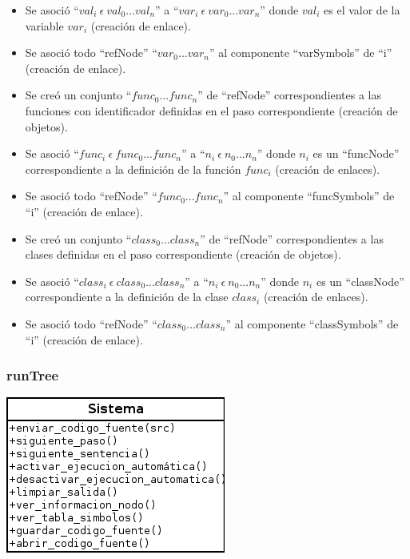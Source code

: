 \begin{framed}
\begin{description}
\begin {itemize}
         \item Se asoció ``$val_i\ \epsilon\ val_0...val_n$'' a  ``$var_i\ \epsilon\ var_0...var_n$'' donde $val_i$ es el valor de la variable $var_i$ (creación de enlace). 
         \item Se asoció todo ``refNode'' ``$var_0...var_n$'' al componente ``varSymbols'' de ``i'' (creación de enlace). 
         \item Se creó un conjunto ``$func_0...func_n$'' de ``refNode'' correspondientes a las funciones con identificador definidas en el paso correspondiente (creación de objetos).
         \item Se asoció ``$func_i\ \epsilon\ func_0...func_n$'' a  ``$n_i\ \epsilon\ n_0...n_n$'' donde $n_i$ es un ``funcNode'' correspondiente a la definición de la función $func_i$ (creación de enlaces).
         \item Se asoció todo ``refNode'' ``$func_0...func_n$'' al componente ``funcSymbols'' de ``i'' (creación de enlace). 
         \item Se creó un conjunto ``$class_0...class_n$'' de ``refNode'' correspondientes a las clases definidas en el paso correspondiente (creación de objetos).
         \item Se asoció ``$class_i\ \epsilon\ class_0...class_n$'' a  ``$n_i\ \epsilon\ n_0...n_n$'' donde $n_i$ es un ``classNode'' correspondiente a la definición de la clase $class_i$ (creación de enlaces).
         \item Se asoció todo ``refNode'' ``$class_0...class_n$'' al componente ``classSymbols'' de ``i'' (creación de enlace). 
      \end{itemize}
	\end{description}
\end{framed}
\FloatBarrier
\subsubsection{runTree}
\begin{center}
\includegraphics[scale=0.7]{operaciones_sistema_runtree.png} \\
\end{center}
